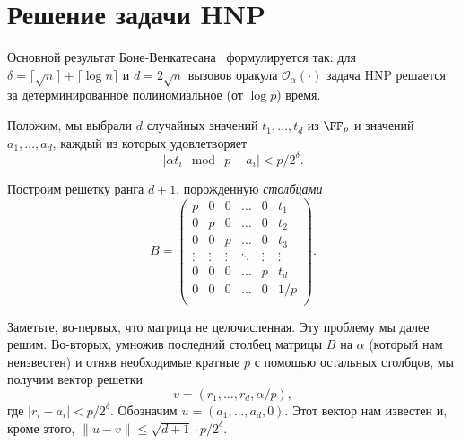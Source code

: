 \documentclass[11pt]{exam}
\theoremstyle{definition}
\newcommand{\bigO}{\mathcal{O}}
\newcommand*\abs[1]{\left\lvert#1\right\rvert}
\begin{document}
{	\section{Решение задачи HNP}
	
	Основной результат Боне-Венкатесана~\cite{BV} формулируется так: для $\delta = \lceil \sqrt{n} \rceil + \lceil \log n\rceil$ и $d = 2\sqrt{n}$ вызовов оракула $\bigO_\alpha(\cdot)$ задача HNP решается за детерминированное полиномиальное (от $\log p$) время.
	
	Положим, мы выбрали $d$ случайных значений $t_1, \ldots, t_d$ из $\FF_p$ и значений $a_1, \ldots, a_d$, каждый из которых удовлетворяет
	\[
		\abs{\alpha t_i~\bmod~p - a_i} < p/2^{\delta}.
	\]
	
	Построим решетку ранга $d+1$, порожденную \emph{столбцами}
	\[
	B = \begin{pmatrix}
	p & 0 & 0 & \ldots & 0 & t_1 \\
	0 & p & 0 & \ldots & 0 & t_2 \\
	0 & 0 & p & \ldots & 0 & t_3 \\
	\vdots & \vdots & \vdots & \ddots & \vdots & \vdots \\
	0 & 0 & 0 & \ldots & p & t_d \\
	0 & 0 & 0 & \ldots & 0 & 1/p \\
	\end{pmatrix}.
	\]
	
	Заметьте, во-первых, что матрица не целочисленная. Эту проблему мы далее решим. Во-вторых, умножив последний столбец матрицы $B$ на $\alpha$ (который нам неизвестен) и отняв необходимые кратные $p$ с помощью остальных столбцов, мы получим вектор решетки
	\[
	v = (r_1,\ldots,r_d,\alpha/p),
	\]
	где $|r_i - a_i| < p/2^\delta$. Обозначим $u = (a_1,\ldots,a_d,0)$. Этот вектор нам известен и, кроме этого, $\| u - v\| \leq \sqrt{d+1}\cdot p/2^\delta$. 
	
}
\end{document}
